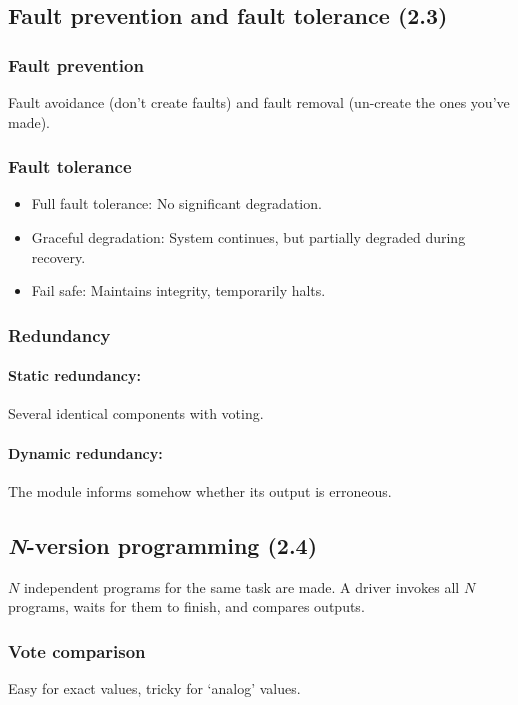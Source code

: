 \documentclass[a4paper, 12pt]{article}
\begin{document}
\subsection{Fault prevention and fault tolerance (2.3)}
\subsubsection{Fault prevention}
Fault avoidance (don't create faults) and fault removal (un-create the ones you've made).

\subsubsection{Fault tolerance}
\begin{itemize}
	\item Full fault tolerance: No significant degradation.
	\item Graceful degradation: System continues, but partially degraded during recovery.
	\item Fail safe: Maintains integrity, temporarily halts.
\end{itemize}

\subsubsection{Redundancy}
\paragraph{Static redundancy: } Several identical components with voting.
\paragraph{Dynamic redundancy: } The module informs somehow whether its output is erroneous.

\subsection{\textit{N}-version programming (2.4)}
\(N\) independent programs for the same task are made. A driver invokes all \(N\) programs, waits for them to finish, and compares outputs.

\subsubsection{Vote comparison}
Easy for exact values, tricky for `analog' values.
\end{document}
